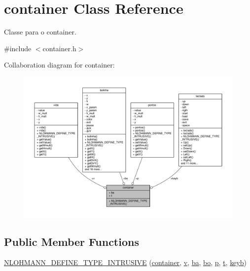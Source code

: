 \hypertarget{classcontainer}{}\section{container Class Reference}
\label{classcontainer}


Classe para o container.  




{\ttfamily \#include $<$container.\+h$>$}



Collaboration diagram for container\+:
\nopagebreak
\begin{figure}[H]
\begin{center}
\leavevmode
\includegraphics[width=350pt]{classcontainer__coll__graph}
\end{center}
\end{figure}
\subsection*{Public Member Functions}
\begin{DoxyCompactItemize}
\item 
\hyperlink{classcontainer_af26f9e7a0ba43c06e5473cfc6ceb18e8}{N\+L\+O\+H\+M\+A\+N\+N\+\_\+\+D\+E\+F\+I\+N\+E\+\_\+\+T\+Y\+P\+E\+\_\+\+I\+N\+T\+R\+U\+S\+I\+VE} (\hyperlink{classcontainer}{container}, \hyperlink{classcontainer_a4325e82e5cadf6795d352eff867701ea}{v}, \hyperlink{classcontainer_ad22e7caec50674c234eff9f4a52e0d2a}{ba}, \hyperlink{classcontainer_a7f91f9ac48a9830e1ce05cd441c21763}{bo}, \hyperlink{classcontainer_acd76736c06d59233703b8df3bed61d69}{p}, \hyperlink{classcontainer_a84e973e8af87828958dff85ad4053b03}{t}, \hyperlink{classcontainer_a22d0cefc9aa2a60d8c0d07b37613d266}{keyb})
\end{DoxyCompactItemize}
